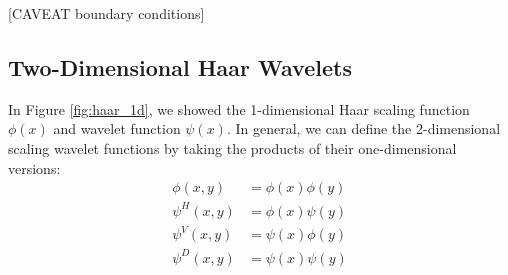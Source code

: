 [CAVEAT boundary conditions]

\subsection{Two-Dimensional Haar Wavelets}
In Figure \ref{fig:haar_1d}, we showed the 1-dimensional Haar scaling function $\phi(x)$ and wavelet function $\psi(x)$.
In general, we can define the 2-dimensional scaling wavelet functions by taking the products of their one-dimensional versions:
\begin{equation}
\label{eqn:2d_haar_wavelets}
  \begin{split}
    \phi(x,y) &= \phi(x) \phi(y)\\
    \psi^H(x,y) &= \phi(x) \psi(y) \\
    \psi^V(x,y) &= \psi(x) \phi(y) \\
    \psi^D(x,y) &= \psi(x) \psi(y)
  \end{split}
\end{equation}

